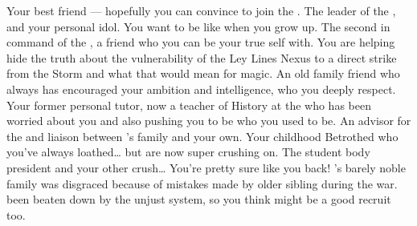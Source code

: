 \documentclass[char]{GL2020}
\begin{document}
\begin{contacts}
    \contact{\cAmbition{}} Your best friend — hopefully you can convince \cAmbition{\them} to join the \pGoaties{}.
    \contact{\cChupLeader{}} The leader of the \pGoaties{}, and your personal idol. You want to be like \cChupLeader{\them} when you grow up.
    \contact{\cChupSecond{}} The second in command of the \pGoaties{}, a friend who you can be your true self with. You are helping \cChupSecond{\them} hide the truth about the vulnerability of the Ley Lines Nexus to a direct strike from the Storm and what that would mean for magic.
    \contact{\cWildCard{}} An old family friend who always has encouraged your ambition and intelligence, who you deeply respect.
    \contact{\cHistory{}} Your former personal tutor, now a teacher of History at the \pSchool{} who has been worried about you and also pushing you to be who you used to be.
    \contact{\cDiplomat{}} An advisor for the \pTech{} and liaison between \cHeir{}'s family and your own.
    \contact{\cHeir{}} Your childhood Betrothed who you've always loathed\ldots{} but are now super crushing on.
    \contact{\cPresident{}} The student body president and your other crush\ldots{} You're pretty sure \cPresident{\they} like you back!
    \contact{\cLibAssist{}} \cLibAssist{}’s barely noble family was disgraced because of mistakes made by \cLibAssist{\their} older sibling during the war. \cLibAssist{\Theyhave} been beaten down by the unjust system, so you think \cLibAssist{\they} might be a good recruit too.
\end{contacts}
\end{document}
